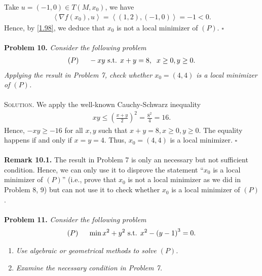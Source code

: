 \documentclass[a4paper]{article}
\numberwithin{equation}{section}
\begin{document}
Take $u=\left(-1,0\right)\in T\left(M,x_0\right)$, we have 
\begin{align}
\left\langle {\nabla f\left( {{x_0}} \right),u} \right\rangle  = \left\langle {\left( {1,2} \right),\left( { - 1,0} \right)} \right\rangle  =  - 1 < 0.
\end{align}
Hence, by \eqref{1.98}, we deduce that $x_0$ is not a local minimizer of $\left(P\right)$. \hfill $\square$\\
\\
\textbf{Problem 10.} \textit{Consider the following problem}
\begin{align}
\left( P \right)\hspace{0.5cm} - xy \mbox{ s.t. } x + y = 8,\hspace{0.2cm} x \ge 0,y \ge 0.
\end{align}
\textit{Applying the result in Problem 7, check whether $x_0=\left(4,4\right)$ is a local minimizer of $\left(P\right)$.}\\
\\
\textsc{Solution.} We apply the well-known Cauchy-Schwarz inequality 
\begin{align}
xy \le {\left( {\frac{{x + y}}{2}} \right)^2} = \frac{{{8^2}}}{4} = 16.
\end{align}
Hence, $-xy \ge -16$ for all $x,y$ such that $x+y=8,x\ge 0,y\ge 0$. The equality happens if and only if $x=y=4$. Thus, $x_0=\left(4,4\right)$ is a local minimizer. \hfill $\square$\\
\\
\textbf{Remark 10.1.} The result in Problem 7 is only an necessary but not sufficient condition. Hence, we can only use it to disprove the statement ``$x_0$ is a local minimizer of $\left(P\right)$'' (i.e., prove that $x_0$ is not a local minimizer as we did in Problem 8, 9) but can not use it to check whether $x_0$ is a local minimizer of $\left(P\right)$.\\
\\
\textbf{Problem 11.} \textit{Consider the following problem}
\begin{align}
\label{1.125}
\left( P \right)\hspace{0.5cm}\min {x^2} + {y^2}\mbox{ s.t. } {x^2} - {\left( {y - 1} \right)^3} = 0.
\end{align}
\begin{enumerate}
\item \textit{Use algebraic or geometrical methods to solve $\left(P\right)$.}
\item \textit{Examine the necessary condition in Problem 7.}
\end{enumerate}
\end{document}
